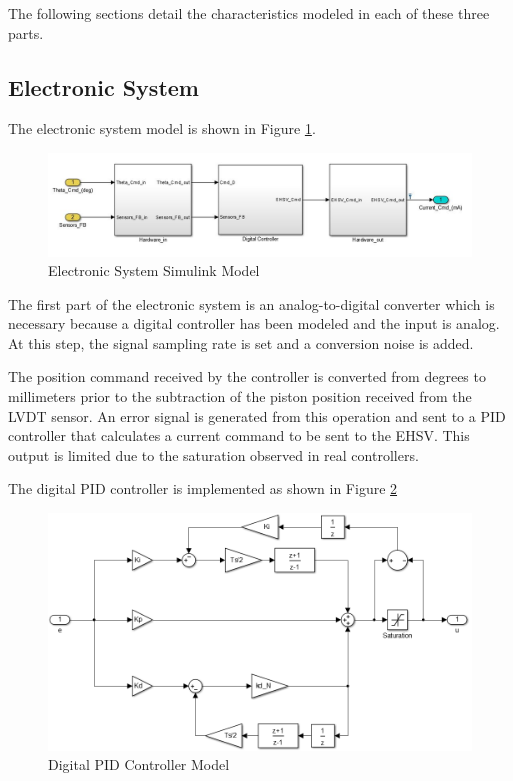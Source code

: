 The following sections detail the characteristics modeled in each of these three parts.

\subsection{Electronic System}

The electronic system model is shown in Figure \ref{fig:3_1_ElectronicSystem}.

\begin{figure}[H]
	\centering
	\centerline{\includegraphics[width=1.1\textwidth]{Figuras/3.ActuationSystemModel/3-1-ElectronicSystem.jpg}}
	\caption{Electronic System Simulink Model}
	\label{fig:3_1_ElectronicSystem}
\end{figure}

The first part of the electronic system is an analog-to-digital converter which is necessary because a digital controller has been modeled and the input is analog. At this step, the signal sampling rate is set and a conversion noise is added.

The position command received by the controller is converted from degrees to millimeters prior to the subtraction of the piston position received from the LVDT sensor. An error signal is generated from this operation and sent to a PID controller that calculates a current command to be sent to the EHSV. This output is limited due to the saturation observed in real controllers.

The digital PID controller is implemented as shown in Figure \ref{fig:3_1_PID}

\begin{figure}[H]
	\centering
	\centerline{\includegraphics[width=1.1\textwidth]{Figuras/3.ActuationSystemModel/3-PID_discrete.png}}
	\caption{Digital PID Controller Model}
	\label{fig:3_1_PID}
\end{figure}


